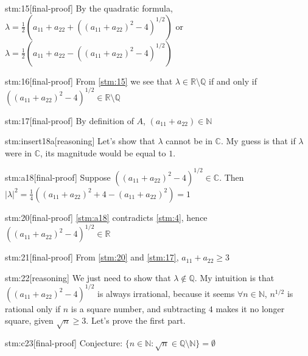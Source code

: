 \begin{stm}{stm:15}[final-proof]
By the quadratic formula, $\lambda = \frac{1}{2}(a_{11} + a_{22} + ((a_{11} + a_{22})^2 - 4)^{1/2})$ or $\lambda = \frac{1}{2}(a_{11} + a_{22} - ((a_{11} + a_{22})^2 - 4)^{1/2})$
\end{stm}

\begin{stm}{stm:16}[final-proof]
From \ref{stm:15} we see that $\lambda \in \mathbb{R} \setminus \mathbb{Q}$ if and only if $((a_{11} + a_{22})^2 - 4)^{1/2} \in \mathbb{R} \setminus \mathbb{Q}$
\end{stm}

\begin{stm}{stm:17}[final-proof]
By definition of $A$, $(a_{11} + a_{22}) \in \mathbb{N}$
\end{stm}

\begin{stm}{stm:insert18a}[reasoning]
Let's show that $\lambda$ cannot be in $\mathbb{C}$. My guess is that if $\lambda$ were in $\mathbb{C}$, its magnitude would be equal to $1$.
\end{stm}

\begin{stm}{stm:a18}[final-proof]
Suppose $((a_{11} + a_{22})^2 - 4)^{1/2} \in \mathbb{C}$. Then $|\lambda|^2 = \frac{1}{4}((a_{11} + a_{22})^2 + 4 - (a_{11} + a_{22})^2) = 1$
\end{stm}

\begin{stm}{stm:20}[final-proof]
\ref{stm:a18} contradicts \ref{stm:4}, hence $((a_{11} + a_{22})^2 - 4)^{1/2} \in \mathbb{R}$
\end{stm}

\begin{stm}{stm:21}[final-proof]
From \ref{stm:20} and \ref{stm:17}, $a_{11} + a_{22} \geq 3$
\end{stm}

\begin{stm}{stm:22}[reasoning]
We just need to show that $\lambda \notin \mathbb{Q}$. My intuition is that $((a_{11} + a_{22})^2 - 4)^{1/2}$ is always irrational, because it seems $\forall n \in \mathbb{N}$, $n^{1/2}$ is rational only if $n$ is a square number, and subtracting $4$ makes it no longer square, given $\sqrt{n} \ge 3$. Let's prove the first part.
\end{stm}

\begin{stm}{stm:c23}[final-proof]
Conjecture: $\{n \in \mathbb{N} : \sqrt{n} \in \mathbb{Q} \setminus \mathbb{N} \} = \emptyset$
\end{stm}


